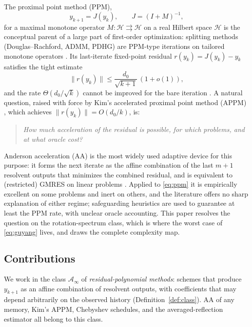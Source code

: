 \documentclass[11pt]{article}
\theoremstyle{definition}
\theoremstyle{remark}
\newcommand{\Hh}{\mathcal{H}}
\newcommand{\Aa}{\mathcal{A}}
\newcommand{\norm}[1]{\| #1 \|}
\begin{document}
The proximal point method (PPM),
\begin{equation}\label{eq:ppm}
y_{k+1}=J(y_k),\qquad J=(I+M)^{-1},
\end{equation}
for a maximal monotone operator $M:\Hh\rightrightarrows\Hh$ on a real Hilbert
space $\Hh$ is the conceptual parent of a large part of first-order
optimization: splitting methods (Douglas--Rachford, ADMM, PDHG) are PPM-type
iterations on tailored monotone operators \cite{rockafellar1976mono,
rockafellar1976aug,eckstein1992douglas}. Its last-iterate fixed-point
residual $r(y_k)=J(y_k)-y_k$ satisfies the tight estimate
\begin{equation}\label{eq:guyang}
\norm{r(y_k)}\le \frac{d_0}{\sqrt{k+1}}\,(1+o(1)),
\end{equation}
and the rate $\Theta(d_0/\sqrt{k})$ cannot be improved for the bare iteration
\cite{guyang2020tight,bravo2019sharp}. A natural question, raised with force
by Kim's accelerated proximal point method (APPM) \cite{kim2021accelerated},
which achieves $\norm{r(y_k)}=O(d_0/k)$, is:

\begin{quote}
\emph{How much acceleration of the residual is possible, for which problems,
and at what oracle cost?}
\end{quote}

Anderson acceleration (AA) \cite{anderson1965iterative,walker2011anderson}
is the most widely used adaptive device for this purpose: it forms the next
iterate as the affine combination of the last $m+1$ resolvent outputs that
minimizes the combined residual, and is equivalent to (restricted) GMRES on
linear problems \cite{walker2011anderson,evans2020proof}. Applied to
\eqref{eq:ppm} it is empirically excellent on some problems and inert on
others, and the literature offers no sharp explanation of either regime;
safeguarding heuristics \cite{zhang2020globally} are used to guarantee at
least the PPM rate, with unclear oracle accounting. This paper resolves the
question on the rotation-spectrum class, which is where the worst case of
\eqref{eq:guyang} lives, and draws the complete complexity map.

\subsection{Contributions}

We work in the class $\Aa_\infty$ of \emph{residual-polynomial methods}:
schemes that produce $y_{k+1}$ as an affine combination of resolvent outputs,
with coefficients that may depend arbitrarily on the observed history
(Definition~\ref{def:class}). AA of any memory, Kim's APPM, Chebyshev
schedules, and the averaged-reflection estimator all belong to this class.
\end{document}
